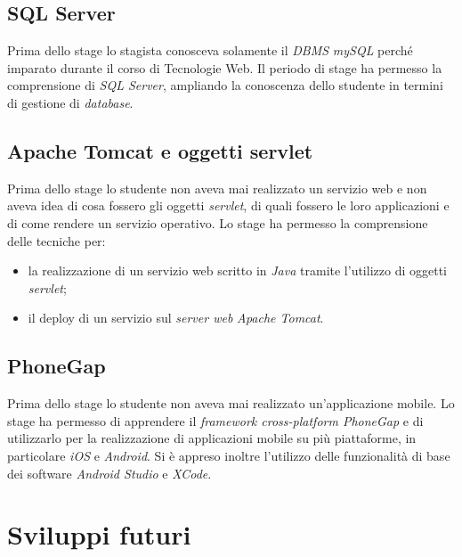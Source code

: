 \subsection{SQL Server}

Prima dello stage lo stagista conosceva solamente il \textit{DBMS} \textit{mySQL} perché imparato durante il corso di Tecnologie Web. Il periodo di stage ha permesso la comprensione di \textit{SQL Server}, ampliando la conoscenza dello studente in termini di gestione di \textit{database}.

\subsection{Apache Tomcat e oggetti servlet}

Prima dello stage lo studente non aveva mai realizzato un servizio web e non aveva idea di cosa fossero gli oggetti \textit{servlet}, di quali fossero le loro applicazioni e di come rendere un servizio operativo. Lo stage ha permesso la comprensione delle tecniche per:
\begin{itemize}
	\item la realizzazione di un servizio web scritto in \textit{Java} tramite l'utilizzo di oggetti \textit{servlet};
	\item il deploy di un servizio sul \textit{server web} \textit{Apache Tomcat}.
\end{itemize}

\subsection{PhoneGap}

Prima dello stage lo studente non aveva mai realizzato un'applicazione mobile. Lo stage ha permesso di apprendere il \textit{framework cross-platform PhoneGap} e di utilizzarlo per la realizzazione di applicazioni mobile su più piattaforme, in particolare \textit{iOS} e \textit{Android}. Si è appreso inoltre l'utilizzo delle funzionalità di base dei software \textit{Android Studio} e \textit{XCode}.

\section{Sviluppi futuri}

